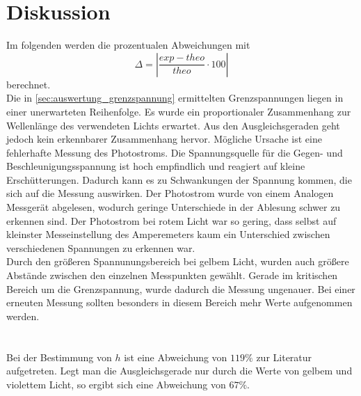 \section{Diskussion}
\label{sec:Diskussion}

Im folgenden werden die prozentualen Abweichungen mit 
\begin{equation}\label{eq:1}
    \Delta = |\frac{exp - theo}{theo} \cdot 100|
\end{equation}
berechnet.
\\
Die in \autoref{sec:auswertung_grenzspannung} ermittelten Grenzspannungen liegen in einer unerwarteten Reihenfolge.
Es wurde ein proportionaler Zusammenhang zur Wellenlänge des verwendeten Lichts erwartet.
Aus den Ausgleichsgeraden geht jedoch kein erkennbarer Zusammenhang hervor. 
Mögliche Ursache ist eine fehlerhafte Messung des Photostroms. 
Die Spannungsquelle für die Gegen- und Beschleunigungsspannung ist hoch empfindlich und reagiert auf kleine Erschütterungen.
Dadurch kann es zu Schwankungen der Spannung kommen, die sich auf die Messung auswirken.
Der Photostrom wurde von einem Analogen Messgerät abgelesen, wodurch geringe Unterschiede in der Ablesung schwer zu erkennen sind.
Der Photostrom bei rotem Licht war so gering, dass selbst auf kleinster Messeinstellung des Amperemeters kaum ein Unterschied zwischen 
verschiedenen Spannungen zu erkennen war.\\
Durch den größeren Spannunungsbereich bei gelbem Licht, wurden auch größere Abstände zwischen den einzelnen Messpunkten gewählt.
Gerade im kritischen Bereich um die Grenzspannung, wurde dadurch die Messung ungenauer. 
Bei einer erneuten Messung sollten besonders in diesem Bereich mehr Werte aufgenommen werden.\\
\\
\\
Bei der Bestimmung von $h$ ist eine Abweichung von $119\%$ zur Literatur aufgetreten\cite{planck}.
Legt man die Ausgleichsgerade nur durch die Werte von gelbem und violettem Licht, so ergibt sich eine Abweichung von $67\%$.